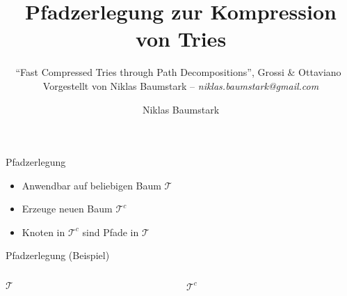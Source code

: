 \documentclass[ngerman,hyperref={pdfpagelabels=true}]{beamer}
\title{Pfadzerlegung zur Kompression von Tries}
\subtitle{
``Fast Compressed Tries through Path Decompositions'',
Grossi \& Ottaviano~\cite{tries} \\[1em]
Vorgestellt von Niklas Baumstark -- \textit{niklas.baumstark@gmail.com}
}
\author{Niklas Baumstark}
\institute{ITI-Sanders}
\newcommand\T{\mathcal{T}}
\begin{document}


\setlength\textheight{7cm} %

\begin{frame}
  \maketitle
\end{frame}


\begin{frame}{Pfadzerlegung}
\begin{itemize}
\item Anwendbar auf beliebigen Baum $\T$
\item Erzeuge neuen Baum $\T^c$
\item Knoten in $\T^c$ sind Pfade in $\T$
\end{itemize}
\end{frame}

\begin{frame}{Pfadzerlegung (Beispiel)}

\begin{columns}[T] %
\begin{column}{.48\textwidth}

\centering
$\T$\\[1em]


\end{column}%
\hfill%
\begin{column}{.48\textwidth}

\centering
$\T^c$\\[1em]


\begin{enumerate}
\end{enumerate}

\end{column}%
\end{columns}

\end{frame}
\end{document}
